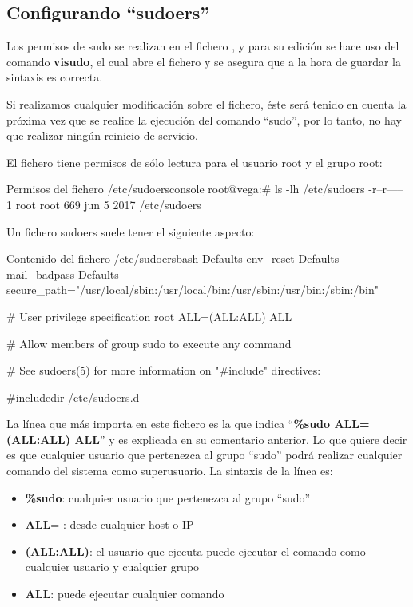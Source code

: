 \subsection{Configurando “sudoers”}
Los permisos de sudo se realizan en el fichero   , y para su edición se hace uso del comando \textbf{visudo}, el cual abre el fichero y se asegura que a la hora de guardar la sintaxis es correcta.

Si realizamos cualquier modificación sobre el fichero, éste será tenido en cuenta la próxima vez que se realice la ejecución del comando “sudo”, por lo tanto, no hay que realizar ningún reinicio de servicio.

El fichero   tiene permisos de sólo lectura para el usuario root y el grupo root:

\begin{mycode}{Permisos del fichero \faFile \hspace{1pt} /etc/sudoers}{console}{}
root@vega:# ls -lh /etc/sudoers
-r--r----- 1 root root 669 jun  5  2017 /etc/sudoers
\end{mycode}

Un fichero sudoers suele tener el siguiente aspecto:

\begin{mycode}{Contenido del fichero \faFile \hspace{1pt} /etc/sudoers}{bash}{\footnotesize}
Defaults    env_reset
Defaults    mail_badpass
Defaults    secure_path="/usr/local/sbin:/usr/local/bin:/usr/sbin:/usr/bin:/sbin:/bin"

# User privilege specification
root    ALL=(ALL:ALL) ALL

# Allow members of group sudo to execute any command

# See sudoers(5) for more information on "#include" directives:

#includedir /etc/sudoers.d
\end{mycode}

La línea que más importa en este fichero es la que indica “\textbf{\%sudo   ALL=(ALL:ALL) ALL}” y es explicada en su comentario anterior. Lo que quiere decir es que cualquier usuario que pertenezca al grupo “sudo” podrá realizar cualquier comando del sistema como superusuario. La sintaxis de la línea es:

\begin{itemize}
    \item \textbf{\%sudo}:  cualquier usuario que pertenezca al grupo “sudo”
    \item \textbf{ALL}= : desde cualquier host o IP
    \item \textbf{(ALL:ALL)}: el usuario que ejecuta puede ejecutar el comando como cualquier usuario y cualquier grupo
    \item \textbf{ALL}: puede ejecutar cualquier comando
\end{itemize}

